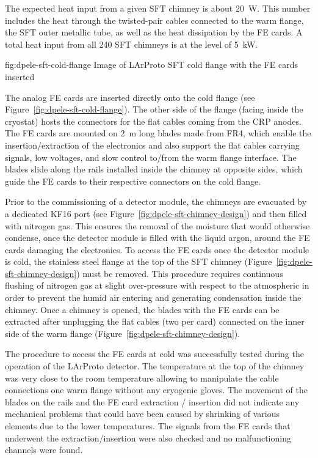 The expected heat input from a given SFT chimney is about \SI{20}{\watt}. This number includes the heat through the twisted-pair cables connected to the warm flange, the SFT outer metallic tube, as well as the heat dissipation by the FE cards. A total heat input from all \num{240} SFT chimneys is at the level of \SI{5}{\kilo\watt}. 

\begin{dunefigure}{fig:dpele-sft-cold-flange}
{Image of LArProto SFT cold flange with the FE cards inserted}
\end{dunefigure}

The analog FE cards are inserted directly onto the cold flange (see Figure~\ref{fig:dpele-sft-cold-flange}). The other side of the flange (facing inside the cryostat) hosts the connectors for the flat cables coming from the CRP anodes.  The FE cards are mounted on \SI{2}{m} long blades made from FR4, which enable the insertion/extraction of the electronics and also support the flat cables carrying signals, low voltages, and slow control to/from the warm flange interface.  The blades slide along the rails installed inside the chimney at opposite sides, which guide the FE cards to their respective connectors on the cold flange. 

Prior to the commissioning of a detector module, the chimneys are evacuated by a dedicated KF16 port (see Figure~\ref{fig:dpele-sft-chimney-design}) and then filled with nitrogen gas. This ensures the removal of the moisture that would otherwise condense, once the detector module is filled with the liquid argon, around the FE cards damaging the electronics. To access the FE cards once the detector module is cold, the stainless steel flange at the top of the SFT chimney (Figure~\ref{fig:dpele-sft-chimney-design}) must be removed. This procedure requires continuous flushing of nitrogen gas at slight over-pressure with respect to the atmospheric in order to prevent the humid air entering and generating condensation inside the chimney. Once a chimney is opened, the blades with the FE cards can be extracted after unplugging the flat cables (two per card) connected on the inner side of the warm flange (Figure~\ref{fig:dpele-sft-chimney-design}).

The procedure to access the FE cards at cold was successfully tested during the operation of the LArProto detector. The temperature at the top of the chimney was very close to the room temperature allowing to manipulate the cable connections one warm flange without any cryogenic gloves. The movement of the blades on the rails and the FE card extraction / insertion did not indicate any mechanical problems that could have been caused by shrinking of various elements due to the lower temperatures.  The signals from the FE cards that underwent the extraction/insertion were also checked and no malfunctioning channels were found.

